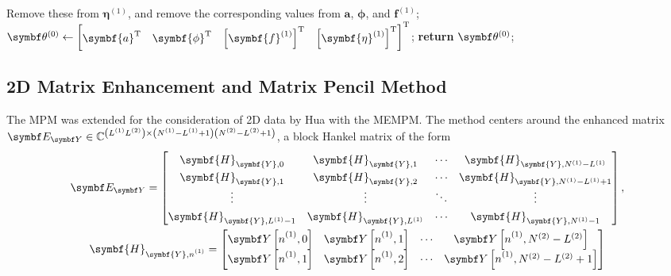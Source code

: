 {\begin{algorithm}
\begin{algorithmic}[1]
                \State Remove these from $\symbf{\eta}^{(1)}$, and remove the
                corresponding values from
                $\symbf{a}$, $\symbf{\phi}$, and $\symbf{f}^{(1)}$;
            \EndIf
            \State $\bthzero \gets
                \begin{bmatrix}
                    \symbf{a}\T &
                    \symbf{\phi}\T &
                    \left[\symbf{f}^{(1)}\right]\T &
                    \left[\symbf{\eta}^{(1)}\right]\T
                \end{bmatrix}\T
            $;
            \State \textbf{return} $\bthzero$;
        \EndProcedure
    \end{algorithmic}
\end{algorithm}


\subsection{2D Matrix Enhancement and Matrix Pencil Method}
The \ac{MPM} was extended for the consideration of \ac{2D} data by Hua with the
\ac{MEMPM}\cite{Hua1992}. The method centers around the enhanced matrix $\EY
\in \mathbb{C}^{\left(\Lone \Ltwo\right) \times \left(\None - \Lone +
1\right)\left(\Ntwo - \Ltwo + 1\right)}$, a block Hankel matrix of the form
\begin{subequations}
    \begin{gather}
        \EY =
        \begin{bmatrix}
            \symbf{H}_{\symbf{Y},0} & \symbf{H}_{\symbf{Y},1} & \cdots & \symbf{H}_{\symbf{Y},\None - \Lone} \\
            \symbf{H}_{\symbf{Y},1} & \symbf{H}_{\symbf{Y},2} & \cdots & \symbf{H}_{\symbf{Y},\None - \Lone + 1} \\
            \vdots & \vdots & \ddots & \vdots \\
            \symbf{H}_{\symbf{Y},\Lone - 1} & \symbf{H}_{\symbf{Y},\Lone} & \cdots & \symbf{H}_{\symbf{Y},\None - 1}
        \end{bmatrix}, \\
        \def\arraystretch{1.3}
        \symbf{H}_{\symbf{Y},\none} =
        \begin{bmatrix}
            \bY\left[ \none, 0 \right] & \bY\left[ \none, 1 \right] & \cdots & \bY\left[ \none, \Ntwo - \Ltwo \right] \\
            \bY\left[ \none, 1 \right] & \bY\left[ \none, 2 \right] & \cdots & \bY\left[ \none, \Ntwo - \Ltwo + 1 \right] \\

\end{bmatrix}
\end{gather}
\end{subequations}}
